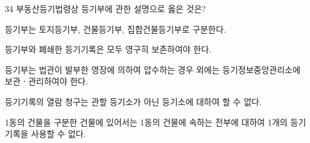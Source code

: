 \begin{question}{34}
부동산등기법령상 등기부에 관한 설명으로 옳은 것은?
\begin{choices}
  \item 등기부는 토지등기부, 건물등기부, 집합건물등기부로 구분한다.
  \item 등기부와 폐쇄한 등기기록은 모두 영구히 보존하여야 한다.
  \item 등기부는 법관이 발부한 영장에 의하여 압수하는 경우 외에는 등기정보중앙관리소에 보관ㆍ관리하여야 한다.
  \item 등기기록의 열람 청구는 관할 등기소가 아닌 등기소에 대하여 할 수 없다.
  \item 1동의 건물을 구분한 건물에 있어서는 1동의 건물에 속하는 전부에 대하여 1개의 등기기록을 사용할 수 없다.
\end{choices}
\end{question}
